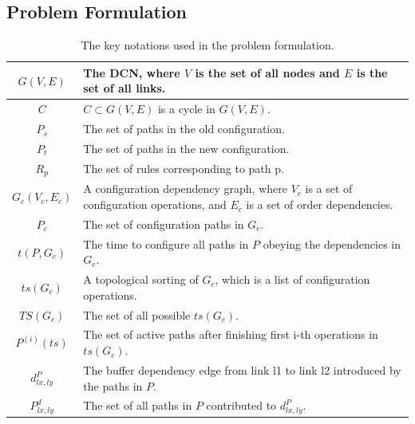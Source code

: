 \subsection{Problem Formulation}\label{subsec:formulation}

\begin{table}
\begin{tabularx}{0.48\textwidth}{ |c||X| } 
	\hline
	$G(V,E)$ & The DCN, where $V$ is the set of all nodes and $E$ is the set of all links. \\ 
	\hline
	$C$ & $C \subset G(V,E)$ is a cycle in $G(V,E)$. \\ 
	\hline
	$P_s$ & The set of paths in the old configuration. \\
	\hline
	$P_t$ & The set of paths in the new configuration. \\
	\hline
	$R_p$ & The set of rules corresponding to path p. \\
	\hline

	$G_c(V_c,E_c)$ & A configuration dependency graph, where $V_c$ is a set of configuration operations, and $E_c$ is a set of order dependencies.\\
	\hline
	$P_c$ & The set of configuration paths in $G_c$.\\
	\hline
	$t(P, G_c)$& The time to configure all paths in $P$ obeying the dependencies in $G_c$.\\
	\hline
	$ts(G_c)$ & A topological sorting of $G_c$, which is a list of configuration operations. \\ 
	\hline
	$TS(G_c)$ & The set of all possible $ts(G_c)$. \\
	\hline
	$P^{(i)}(ts)$& The set of active paths after finishing first i-th operations in $ts(G_c)$.\\
	\hline
	$d_{lx,ly}^P$ & The buffer dependency edge from link l1 to link l2 introduced by the paths in $P$.\\
	\hline
	$P^d_{lx,ly}$ & The set of all paths in $P$ contributed to  $d_{lx,ly}^P$.\\
	\hline
\end{tabularx}
\caption{The key notations used in the problem formulation.}\label{table:formulation}
\end{table}




